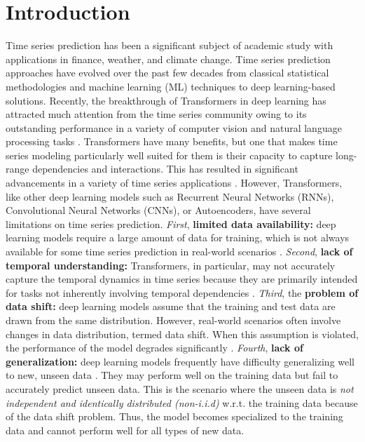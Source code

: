 \documentclass[letterpaper]{article} %
\begin{document}
\section{Introduction}
Time series prediction has been a significant subject of academic study with applications in finance, weather, and climate change. Time series prediction approaches have evolved over the past few decades from classical statistical methodologies and machine learning (ML) techniques to deep learning-based solutions. Recently, the breakthrough of Transformers in deep learning has attracted much attention from the time series community owing to its outstanding performance in a variety of computer vision and natural language processing tasks \cite{vaswani2017attention, wen2022transformers}. Transformers have many benefits, but one that makes time series modeling particularly well suited for them is their capacity to capture long-range dependencies and interactions. This has resulted in significant advancements in a variety of time series applications \cite{ahmed2023transformers}. However, Transformers, like other deep learning models such as Recurrent Neural Networks (RNNs), Convolutional Neural Networks (CNNs), or Autoencoders,  have several limitations on time series prediction. \emph{First}, \textbf{limited data availability:} deep learning models require a large amount of data for training, which is not always available for some time series prediction in real-world scenarios \cite{sun2017revisiting}. \emph{Second}, \textbf{lack of temporal understanding:} Transformers, in particular, may not accurately capture the temporal dynamics in time series because they are primarily intended for tasks not inherently involving temporal dependencies \cite{zeng2023transformers}. \emph{Third}, the \textbf{problem of data shift:} deep learning models assume that the training and test data are drawn from the same distribution. However, real-world scenarios often involve changes in data distribution, termed data shift. When this assumption is violated, the performance of the model degrades significantly \cite{farahani2021brief}. \emph{Fourth}, \textbf{lack of generalization:} deep learning models frequently have difficulty generalizing well to new, unseen data \cite{ying2019overview}. They may perform well on the training data but fail to accurately predict unseen data. This is the scenario where the unseen data is \textit{not independent and identically distributed (non-i.i.d)} w.r.t. the training data because of the data shift problem. Thus, the model becomes specialized to the training data and cannot perform well for all types of new data.
\end{document}
